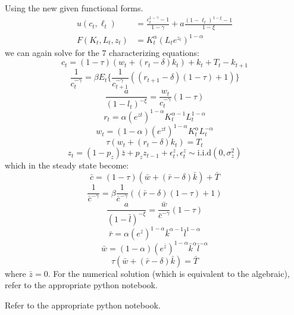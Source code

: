 \documentclass[12pt]{article}
\newenvironment{problem}[2][Problem]{\begin{trivlist}
\item[\hskip \labelsep {\bfseries #1}\hskip \labelsep {\bfseries #2}]}{\end{trivlist}}
\begin{document}
\begin{problem}{6.} 
Using the new given functional forms.
\begin{equation}\label{DSGE_HW_CES_eq01}
\begin{split}
u(c_t,\ell_t) & = \frac{c^{1-\gamma}_t -1}{1-\gamma}+ a \frac{(1-\ell_t)^{1-\xi}-1}{1-\xi}      \\
F(K_t,L_t,z_t) & = K^{\alpha}_t (L_te^{z_t})^{1-\alpha}  \nonumber
\end{split}
\end{equation}
we can again solve for the 7 characterizing equations: 
$$c_t = (1-\tau)(w_t+ (r_t -\delta)k_t) + k_t + T_t - k_{t+1}$$
$$\frac{1}{c_t^{-\gamma}} = \beta E_t \big\{ \frac{1}{c_{t+1}^{-\gamma}}((r_{t+1} - \delta)(1-\tau)+ 1) \big\}$$
$$\frac{a}{(1-l_t)^{-\xi}} = \frac{w_t}{c_t^{-\gamma}}(1-\tau)$$
$$r_t = \alpha (e^{zt})^{1-\alpha} K_t^{\alpha-1} L_t^ {1-\alpha}$$
$$w_t = (1-\alpha) (e^{zt})^{1-\alpha} K_t^{\alpha}L_t^ {-\alpha} $$
$$\tau(w_t + (r_t -\delta)k_t) = T_t$$
$$z_t = (1-p_z)\bar{z} + p_zz_{t-1} + \epsilon^z_t,  \epsilon^z_t \sim \text{i.i.d}(0, \sigma^2_z)$$
which in the steady state become:
$$\bar{c} = (1-\tau)(\bar{w} + (\bar{r} -\delta)\bar{k}) + \bar{T}$$
$$\frac{1}{\bar{c}^{-\gamma}} = \beta \frac{1}{\bar{c}^{-\gamma}}((\bar{r} - \delta)(1-\tau)+ 1) $$
$$\frac{a}{(1-\bar{l})^{-\xi}} = \frac{\bar{w}}{\bar{c}^{-\gamma}}(1-\tau)$$
$$\bar{r} = \alpha (e^{\bar{z}})^{1-\alpha} \bar{k}^{\alpha-1} \bar{l}^{1-\alpha} $$
$$\bar{w} = (1-\alpha) (e^{\bar{z}})^{1-\alpha} \bar{k}^{\alpha} \bar{l}^{-\alpha}$$
$$\tau(\bar{w} + (\bar{r} -\delta)\bar{k}) =  \bar{T}$$
where $\bar{z} = 0$. 
For the numerical solution (which is equivalent to the algebraic), refer to the appropriate python notebook.
\end{problem}

\begin{problem}{8.} 
Refer to the appropriate python notebook. 
\end{problem}
\end{document}

